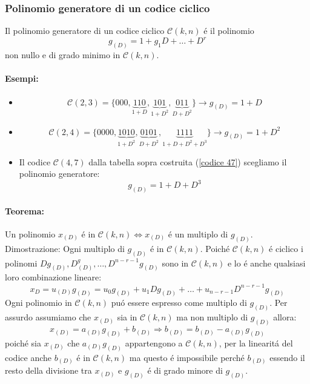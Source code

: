         \subsubsection{Polinomio generatore di un codice ciclico}
            Il polinomio generatore di un codice ciclico $\mathcal{C}(k,n)$ é il polinomio
            \[
                g_{(D)} = 1+g_1D+ \dots + D^r    
            \]
            non nullo e di grado minimo in $\mathcal{C}(k,n)$.
            \paragraph{Esempi:}
            \begin{itemize}
                \item {
                    \[
                        \mathcal{C}(2,3) = \{000,\underset{1+D}{\underbrace{110}},\underset{1+D^2}{\underbrace{101}},\underset{D+D^2}{\underbrace{011}}\}\rightarrow g_{(D)} = 1+D  
                    \]
                }
                \item {
                    \[
                        \mathcal{C}(2,4) = \{0000,\underset{1+D^2}{\underbrace{1010}},\underset{D+D^2}{\underbrace{0101}},\underset{1+D+D^2+D^3}{\underbrace{1111}}\}\rightarrow g_{(D)} = 1+D^2 
                    \]
                }
                \item {
                    Il codice $\mathcal{C}(4,7)$ dalla tabella sopra costruita (\ref{codice 47}) scegliamo il polinomio generatore:
                    \[
                        g_{(D)} = 1+D+D^3
                    \]   
                }
            \end{itemize}
            \paragraph{Teorema:}
                \begin{sloppypar}
                    Un polinomio $x_{(D)}$ é in ${\mathcal{C}(k,n)\Leftrightarrow x_{(D)}}$ é un multiplo di $g_{(D)}$. Dimostrazione:
                    Ogni multiplo di $g_{(D)}$ é in $\mathcal{C}(k,n)$. Poiché $\mathcal{C}(k,n)$ é ciclico i polinomi ${Dg_{(D)},D^g_{(D)},\dots,D^{n-r-1}g_{(D)}}$
                    sono in $\mathcal{C}(k,n)$ e lo é anche qualsiasi loro combinazione lineare:
                    \[
                        x_{D} = u_{(D)}g_{(D)}=u_0g_{(D)}+u_1Dg_{(D)}+ \dots + u_{n-r-1}D^{n-r-1}g_{(D)}
                    \]
                    Ogni polinomio in $\mathcal{C}(k,n)$ puó essere espresso come multiplo di $g_{(D)}$. Per assurdo assumiamo che $x_{(D)}$ sia in $\mathcal{C}(k,n)$
                    ma non multiplo di $g_{(D)}$ allora:
                    \[
                        x_{(D)} =a_{(D)}g_{(D)}+b_{(D)}\Rightarrow b_{(D)} =b_{(D)}-a_{(D)}g_{(D)}  
                    \]
                    poiché sia $x_{(D)}$ che $a_{(D)}g_{(D)}$ appartengono a $\mathcal{C}(k,n)$, per la linearitá del codice anche $b_{(D)}$ é in $\mathcal{C}(k,n)$
                    ma questo é impossibile perché $b_{(D)}$ essendo il resto della divisione tra $x_{(D)}$ e $g_{(D)}$ é di grado minore di $g_{(D)}$.
                \end{sloppypar}
